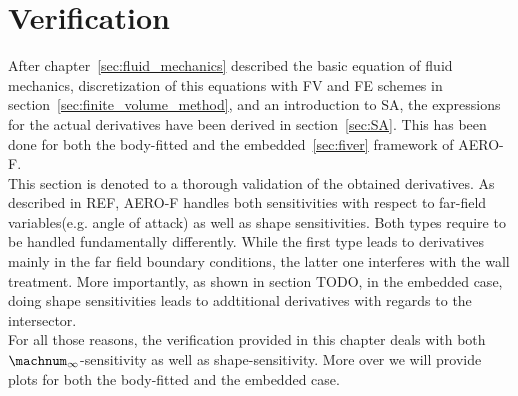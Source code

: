 \documentclass[../main.tex]{subfiles}
\begin{document}
\setlength{\delimitershortfall}{0pt}

\section{Verification}\label{sec:verification}
After chapter~\ref{sec:fluid_mechanics} described the basic equation of fluid mechanics, discretization of this equations with \ac{FV} and \ac{FE} schemes in section~\ref{sec:finite_volume_method}, and an introduction to \ac{SA}, the expressions for the actual derivatives have been derived in section~\ref{sec:SA}. This has been done for both the body-fitted and the embedded~\ref{sec:fiver} framework of AERO-F.\\
This section is denoted to a thorough validation of the obtained derivatives. As described in REF, AERO-F handles both sensitivities with respect to far-field variables(e.g. angle of attack) as well as shape sensitivities. Both types require to be handled fundamentally differently. While the first type leads to derivatives mainly in the far field boundary conditions, the latter one interferes with the wall treatment. More importantly, as shown in section TODO, in the embedded case, doing shape sensitivities leads to addtitional derivatives with regards to the intersector.\\
For all those reasons, the verification provided in this chapter deals with both $\machnum_{\infty}$-sensitivity as well as shape-sensitivity. More over we will provide plots for both the body-fitted and the embedded case.
\end{document}
